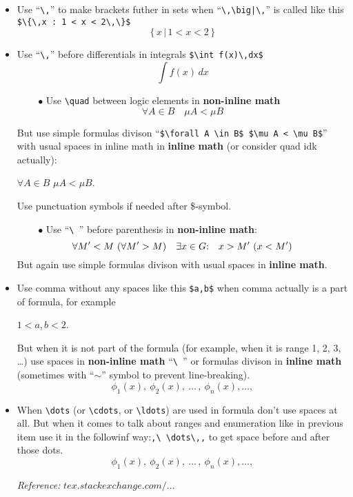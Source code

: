\documentclass[a5paper,openany,9pt]{extbook}
\begin{document}
\begin{itemize}
\item
Use ``\verb=\,='' to make brackets futher in sets when ``\verb=\,\big|\,='' is called like this \verb|$\{\,x : 1 < x < 2\,\}$|
$$\{\,x \,\big|\, 1 < x < 2\,\}$$
\item
Use ``\verb=\,='' before differentials in integrals \verb=$\int f(x)\,dx$=
$$ \int f(x)\, dx$$
\item[\colorbox{prpl}{\textcolor{white}{MY}}\ $\bullet$]
Use \verb|\quad| between logic elements in \textbf{non-inline math}
$$
\forall A \in B \quad \mu A < \mu B 
$$

But use simple formulas divison ``\verb=$\forall A \in B$ $\mu A < \mu B$='' with usual spaces in inline math in \textbf{inline math} (or consider quad idk actually): 
\begin{center}
$\forall A \in B$ $\mu A < \mu B$.
\end{center}
Use punctuation symbols if needed after \$-symbol.
\item[\colorbox{prpl}{\textcolor{white}{MY}}\ $\bullet$]
Use ``\verb|\ |'' before parenthesis in \textbf{non-inline math}:
$$
\forall M' < M \ (\forall M' > M)\quad \exists x\in G{:}\quad x>M' \ (x<M')
$$
But again use simple formulas divison with usual spaces in \textbf{inline math}.

\item 
Use comma without any spaces like this \verb|$a,b$| when comma actually is a part of formula, for example
\begin{center}
$1<a,b<2$. 
\end{center}
But when it is not part of the formula (for example, when it is range 1, 2, 3, \dots) use spaces in \textbf{non-inline math} ``\verb|\ |'' or formulas divison in \textbf{inline math} (sometimes with ``$\sim$'' symbol to prevent line-breaking).
$$
\phi_1(x), \ \phi_2(x),\ \ldots\,,\ \phi_n(x), \ldots,
$$
\item 
When \verb|\dots| (or \verb|\cdots|, or \verb|\ldots|) are used in formula don't use spaces at all. But when it comes to talk about ranges and enumeration like in previous item use it in the followinf way:\verb|,\ \dots\,,| to get space before and after those dots.
$$
\phi_1(x), \ \phi_2(x),\ \ldots\,,\ \phi_n(x), \ldots,
$$

\textit{Reference:} \href{https://tex.stackexchange.com/questions/115030/using-commas-in-mathematical-formulas}{$tex.stackexchange.com/...$}
\end{itemize}
\end{document}
